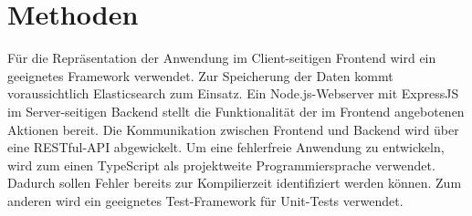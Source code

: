 \documentclass[a4paper, 10pt, conference]{ieeeconf}
\begin{document}
\section{Methoden} \label{s:methoden}

Für die Repräsentation der Anwendung im Client-seitigen Frontend wird ein geeignetes Framework verwendet. Zur Speicherung der Daten kommt voraussichtlich Elasticsearch zum Einsatz. Ein Node.js-Webserver mit ExpressJS im Server-seitigen Backend stellt die Funktionalität der im Frontend angebotenen Aktionen bereit. Die Kommunikation zwischen Frontend und Backend wird über eine RESTful-API abgewickelt. Um eine fehlerfreie Anwendung zu entwickeln, wird zum einen TypeScript als projektweite Programmiersprache verwendet. Dadurch sollen Fehler bereits zur Kompilierzeit identifiziert werden können. Zum anderen wird ein geeignetes Test-Framework für Unit-Tests verwendet.

\printbibliography
\end{document}
